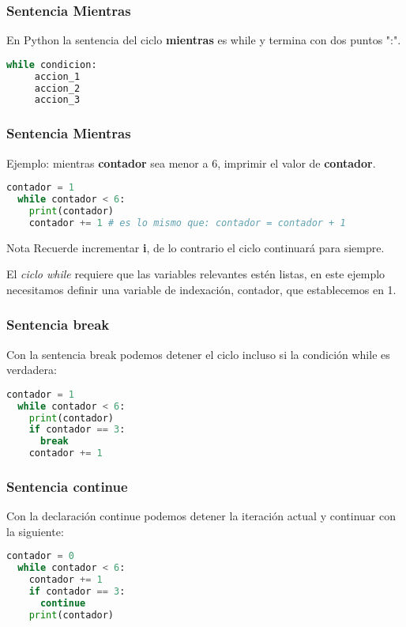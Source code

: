 \begin{frame}[fragile]
  \frametitle{Sentencia Mientras}

  En Python la sentencia del ciclo \textbf{mientras} es
  \textcolor{codeKeyword}{while} y termina con dos puntos ":".

  \vspace{\baselineskip}
  \begin{lstlisting}[language=Python]
  while condicion:
     accion_1
     accion_2
     accion_3
  \end{lstlisting}
\end{frame}

\begin{frame}[fragile]
  \frametitle{Sentencia Mientras}

  Ejemplo: mientras \textbf{contador} sea menor a 6, imprimir el valor
  de \textbf{contador}.

  \vspace{\baselineskip}
  \begin{lstlisting}[language=Python]
  contador = 1
  while contador < 6:
    print(contador)
    contador += 1 # es lo mismo que: contador = contador + 1
  \end{lstlisting}

  \pausa
  \begin{alertblock}{Nota}
    Recuerde incrementar \textbf{i}, de lo contrario el ciclo continuará
    para siempre.
  \end{alertblock}

  El \emph{ciclo while} requiere que las variables relevantes estén listas,
  en este ejemplo necesitamos definir una variable de indexación, contador,
  que establecemos en 1.
\end{frame}

\begin{frame}[fragile]
  \frametitle{Sentencia \textbf{break}}

  Con la sentencia \textcolor{codeKeyword}{break} podemos detener el ciclo incluso si la
  condición while es verdadera:

  \vspace{\baselineskip}
  \begin{lstlisting}[language=Python]
  contador = 1
  while contador < 6:
    print(contador)
    if contador == 3:
      break
    contador += 1
  \end{lstlisting}
\end{frame}

\begin{frame}[fragile]
  \frametitle{Sentencia \textbf{continue}}

  Con la declaración \textcolor{codeKeyword}{continue} podemos detener la iteración actual
  y continuar con la siguiente:

  \vspace{\baselineskip}
  \begin{lstlisting}[language=Python]
  contador = 0
  while contador < 6:
    contador += 1
    if contador == 3:
      continue
    print(contador)
  \end{lstlisting}
\end{frame}

